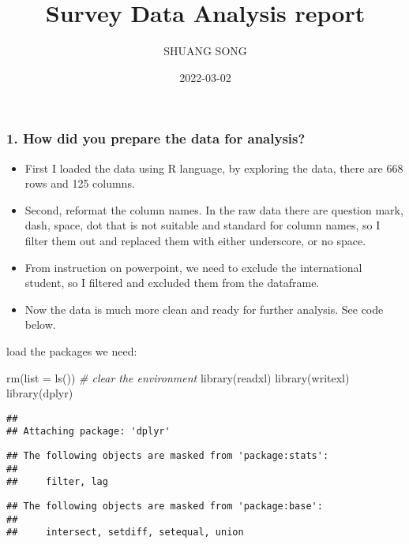 \documentclass[
]{article}
\title{Survey Data Analysis report}
\author{SHUANG SONG}
\date{2022-03-02}
\newenvironment{Shaded}{\begin{snugshade}}{\end{snugshade}}
\newcommand{\AttributeTok}[1]{\textcolor[rgb]{0.77,0.63,0.00}{#1}}
\newcommand{\CommentTok}[1]{\textcolor[rgb]{0.56,0.35,0.01}{\textit{#1}}}
\newcommand{\FunctionTok}[1]{\textcolor[rgb]{0.00,0.00,0.00}{#1}}
\newcommand{\NormalTok}[1]{#1}
\providecommand{\tightlist}{%
  \setlength{\itemsep}{0pt}\setlength{\parskip}{0pt}}
\begin{document}
\maketitle

\hypertarget{how-did-you-prepare-the-data-for-analysis}{%
\subsubsection{1. How did you prepare the data for
analysis?}\label{how-did-you-prepare-the-data-for-analysis}}

\begin{itemize}
\tightlist
\item
  First I loaded the data using R language, by exploring the data, there
  are 668 rows and 125 columns.
\item
  Second, reformat the column names. In the raw data there are question
  mark, dash, space, dot that is not suitable and standard for column
  names, so I filter them out and replaced them with either underscore,
  or no space.
\item
  From instruction on powerpoint, we need to exclude the international
  student, so I filtered and excluded them from the dataframe.
\item
  Now the data is much more clean and ready for further analysis. See
  code below.
\end{itemize}

load the packages we need:

\begin{Shaded}
\begin{Highlighting}[]
\FunctionTok{rm}\NormalTok{(}\AttributeTok{list =} \FunctionTok{ls}\NormalTok{()) }\CommentTok{\# clear the environment}
\FunctionTok{library}\NormalTok{(readxl)}
\FunctionTok{library}\NormalTok{(writexl)}
\FunctionTok{library}\NormalTok{(dplyr)}
\end{Highlighting}
\end{Shaded}

\begin{verbatim}
## 
## Attaching package: 'dplyr'
\end{verbatim}

\begin{verbatim}
## The following objects are masked from 'package:stats':
## 
##     filter, lag
\end{verbatim}

\begin{verbatim}
## The following objects are masked from 'package:base':
## 
##     intersect, setdiff, setequal, union
\end{verbatim}
\end{document}
